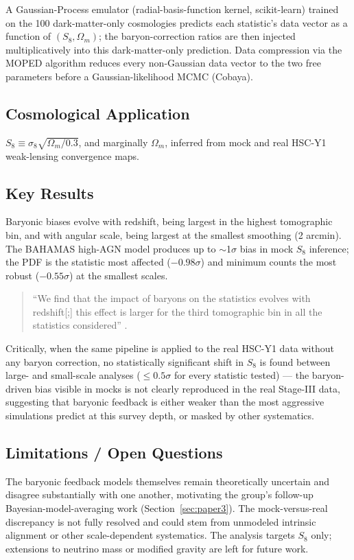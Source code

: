 \documentclass[11pt]{article}
\begin{document}
\noindent A Gaussian-Process emulator (radial-basis-function kernel, scikit-learn) trained on the 100 dark-matter-only cosmologies predicts each statistic's data vector as a function of $(S_8,\Omega_m)$; the baryon-correction ratios are then injected multiplicatively into this dark-matter-only prediction. Data compression via the MOPED algorithm reduces every non-Gaussian data vector to the two free parameters before a Gaussian-likelihood MCMC (Cobaya).

\subsection{Cosmological Application}
$S_8\equiv\sigma_8\sqrt{\Omega_m/0.3}$, and marginally $\Omega_m$, inferred from mock and real HSC-Y1 weak-lensing convergence maps.

\subsection{Key Results}
Baryonic biases evolve with redshift, being largest in the highest tomographic bin, and with angular scale, being largest at the smallest smoothing (2 arcmin). The BAHAMAS high-AGN model produces up to $\sim$1$\sigma$ bias in mock $S_8$ inference; the PDF is the statistic most affected ($-0.98\sigma$) and minimum counts the most robust ($-0.55\sigma$) at the smallest scales.

\begin{quote}
\enquote{We find that the impact of baryons on the statistics evolves with redshift[;] this effect is larger for the third tomographic bin in all the statistics considered} \citep[p.~10]{grandon2024baryonic}.
\end{quote}

\noindent Critically, when the same pipeline is applied to the real HSC-Y1 data without any baryon correction, no statistically significant shift in $S_8$ is found between large- and small-scale analyses ($\leq0.5\sigma$ for every statistic tested) — the baryon-driven bias visible in mocks is not clearly reproduced in the real Stage-III data, suggesting that baryonic feedback is either weaker than the most aggressive simulations predict at this survey depth, or masked by other systematics.

\subsection{Limitations / Open Questions}
The baryonic feedback models themselves remain theoretically uncertain and disagree substantially with one another, motivating the group's follow-up Bayesian-model-averaging work (Section~\ref{sec:paper3}). The mock-versus-real discrepancy is not fully resolved and could stem from unmodeled intrinsic alignment or other scale-dependent systematics. The analysis targets $S_8$ only; extensions to neutrino mass or modified gravity are left for future work.
\end{document}

